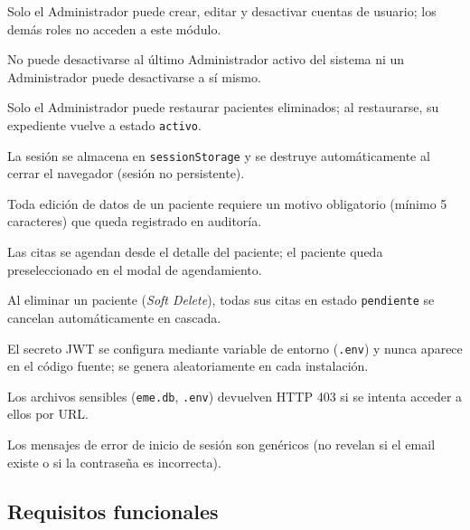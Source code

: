 \documentclass[11pt,a4paper]{article}
\begin{document}
\begin{description}[leftmargin=1.5cm,style=nextline,itemsep=4pt]
    \item[\textbf{RN30:}] Solo el Administrador puede crear, editar y desactivar cuentas de usuario; los demás roles no acceden a este módulo.
    \item[\textbf{RN31:}] No puede desactivarse al último Administrador activo del sistema ni un Administrador puede desactivarse a sí mismo.
    \item[\textbf{RN32:}] Solo el Administrador puede restaurar pacientes eliminados; al restaurarse, su expediente vuelve a estado \texttt{activo}.
    \item[\textbf{RN33:}] La sesión se almacena en \texttt{sessionStorage} y se destruye automáticamente al cerrar el navegador (sesión no persistente).
    \item[\textbf{RN34:}] Toda edición de datos de un paciente requiere un motivo obligatorio (mínimo 5 caracteres) que queda registrado en auditoría.
    \item[\textbf{RN35:}] Las citas se agendan desde el detalle del paciente; el paciente queda preseleccionado en el modal de agendamiento.
    \item[\textbf{RN36:}] Al eliminar un paciente (\textit{Soft Delete}), todas sus citas en estado \texttt{pendiente} se cancelan automáticamente en cascada.
    \item[\textbf{RN37:}] El secreto JWT se configura mediante variable de entorno (\texttt{.env}) y nunca aparece en el código fuente; se genera aleatoriamente en cada instalación.
    \item[\textbf{RN38:}] Los archivos sensibles (\texttt{eme.db}, \texttt{.env}) devuelven HTTP 403 si se intenta acceder a ellos por URL.
    \item[\textbf{RN39:}] Los mensajes de error de inicio de sesión son genéricos (no revelan si el email existe o si la contraseña es incorrecta).
\end{description}

\subsection{Requisitos funcionales}
\end{document}
